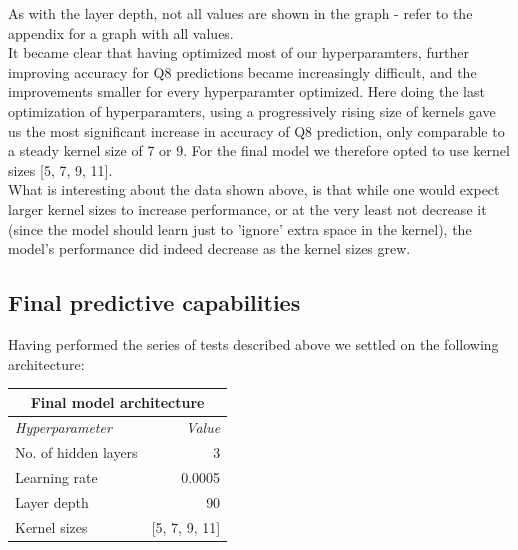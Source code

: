 \noindent As with the layer depth, not all values are shown in the graph - refer to the appendix for a graph with all values.\\
It became clear that having optimized most of our hyperparamters, further improving accuracy for Q8 predictions became increasingly difficult, and the improvements smaller for every hyperparamter optimized. Here doing the last optimization of hyperparamters, using a progressively rising size of kernels gave us the most significant increase in accuracy of Q8 prediction, only comparable to a steady kernel size of 7 or 9. For the final model we therefore opted to use kernel sizes [5, 7, 9, 11].\\
What is interesting about the data shown above, is that while one would expect larger kernel sizes to increase performance, or at the very least not decrease it (since the model should learn just to 'ignore' extra space in the kernel), the model's performance did indeed decrease as the kernel sizes grew.



\subsection{Final predictive capabilities}
Having performed the series of tests described above we settled on the following architecture:
\begin{table}[H]
\centering
\begin{tabular}{lr}
\multicolumn{2}{c}{\textbf{Final model architecture}} \\ \hline
\multicolumn{1}{l|}{\textit{Hyperparameter}} & \textit{Value} \\ \hline
\multicolumn{1}{l|}{No. of hidden layers} & 3 \\
\multicolumn{1}{l|}{Learning rate} & 0.0005 \\
\multicolumn{1}{l|}{Layer depth} & 90 \\
\multicolumn{1}{l|}{Kernel sizes} & {[}5, 7, 9, 11{]}
\end{tabular}
\end{table}

